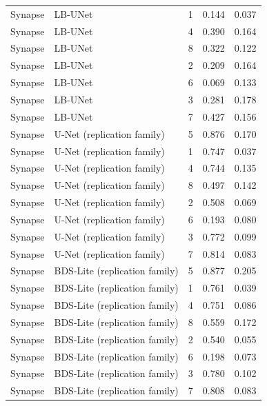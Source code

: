 \begin{tabular}{lllll}
Synapse & LB-UNet & 1 & 0.144 & 0.037 \\
Synapse & LB-UNet & 4 & 0.390 & 0.164 \\
Synapse & LB-UNet & 8 & 0.322 & 0.122 \\
Synapse & LB-UNet & 2 & 0.209 & 0.164 \\
Synapse & LB-UNet & 6 & 0.069 & 0.133 \\
Synapse & LB-UNet & 3 & 0.281 & 0.178 \\
Synapse & LB-UNet & 7 & 0.427 & 0.156 \\
Synapse & U-Net (replication family) & 5 & 0.876 & 0.170 \\
Synapse & U-Net (replication family) & 1 & 0.747 & 0.037 \\
Synapse & U-Net (replication family) & 4 & 0.744 & 0.135 \\
Synapse & U-Net (replication family) & 8 & 0.497 & 0.142 \\
Synapse & U-Net (replication family) & 2 & 0.508 & 0.069 \\
Synapse & U-Net (replication family) & 6 & 0.193 & 0.080 \\
Synapse & U-Net (replication family) & 3 & 0.772 & 0.099 \\
Synapse & U-Net (replication family) & 7 & 0.814 & 0.083 \\
Synapse & BDS-Lite (replication family) & 5 & 0.877 & 0.205 \\
Synapse & BDS-Lite (replication family) & 1 & 0.761 & 0.039 \\
Synapse & BDS-Lite (replication family) & 4 & 0.751 & 0.086 \\
Synapse & BDS-Lite (replication family) & 8 & 0.559 & 0.172 \\
Synapse & BDS-Lite (replication family) & 2 & 0.540 & 0.055 \\
Synapse & BDS-Lite (replication family) & 6 & 0.198 & 0.073 \\
Synapse & BDS-Lite (replication family) & 3 & 0.780 & 0.102 \\
Synapse & BDS-Lite (replication family) & 7 & 0.808 & 0.083 \\
\bottomrule
\end{tabular}
